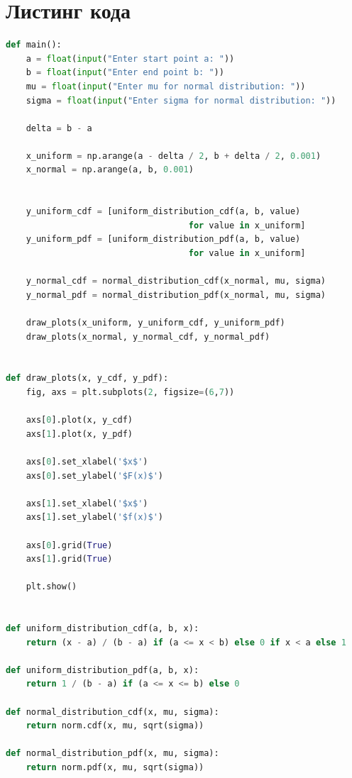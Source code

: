 \documentclass[a4paper, 12pt]{article}
\begin{document}
\section{Листинг кода}


\lstset{style=mystyle}

\begin{lstlisting}[language=Python, caption = программная реализация равномерного распределения и нормального распределения]
def main():
	a = float(input("Enter start point a: "))
	b = float(input("Enter end point b: "))
	mu = float(input("Enter mu for normal distribution: "))
	sigma = float(input("Enter sigma for normal distribution: "))

	delta = b - a

	x_uniform = np.arange(a - delta / 2, b + delta / 2, 0.001)
	x_normal = np.arange(a, b, 0.001)


	y_uniform_cdf = [uniform_distribution_cdf(a, b, value) 
									for value in x_uniform]
	y_uniform_pdf = [uniform_distribution_pdf(a, b, value) 
									for value in x_uniform]

	y_normal_cdf = normal_distribution_cdf(x_normal, mu, sigma)
	y_normal_pdf = normal_distribution_pdf(x_normal, mu, sigma)

	draw_plots(x_uniform, y_uniform_cdf, y_uniform_pdf)
	draw_plots(x_normal, y_normal_cdf, y_normal_pdf)


def draw_plots(x, y_cdf, y_pdf):
	fig, axs = plt.subplots(2, figsize=(6,7))

	axs[0].plot(x, y_cdf)
	axs[1].plot(x, y_pdf)

	axs[0].set_xlabel('$x$')
	axs[0].set_ylabel('$F(x)$')

	axs[1].set_xlabel('$x$')
	axs[1].set_ylabel('$f(x)$')

	axs[0].grid(True)
	axs[1].grid(True)

	plt.show()


def uniform_distribution_cdf(a, b, x):
	return (x - a) / (b - a) if (a <= x < b) else 0 if x < a else 1

def uniform_distribution_pdf(a, b, x):
	return 1 / (b - a) if (a <= x <= b) else 0

def normal_distribution_cdf(x, mu, sigma):
	return norm.cdf(x, mu, sqrt(sigma))

def normal_distribution_pdf(x, mu, sigma):
	return norm.pdf(x, mu, sqrt(sigma))
\end{lstlisting}
\end{document}

